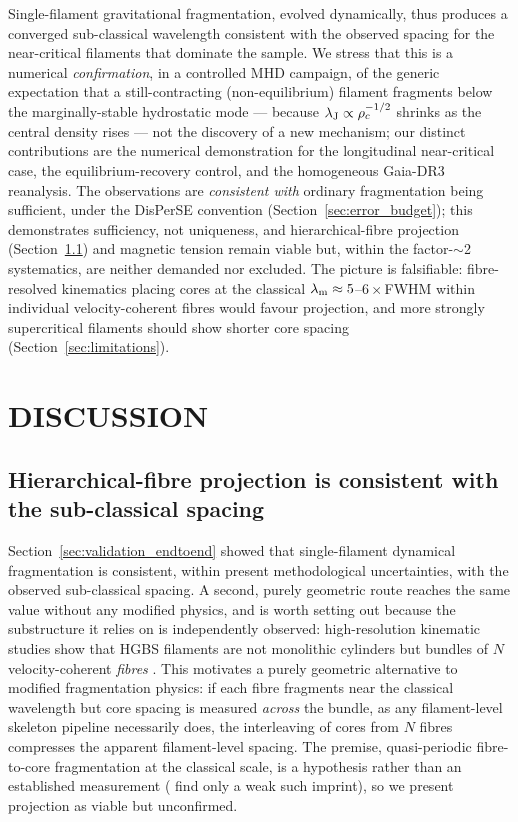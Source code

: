 \documentclass[usenatbib,twoside,twocolumn]{mnras}
\begin{document}
Single-filament gravitational fragmentation, evolved dynamically, thus produces a converged sub-classical wavelength consistent with the observed spacing for the near-critical filaments that dominate the sample. We stress that this is a numerical \emph{confirmation}, in a controlled MHD campaign, of the generic expectation that a still-contracting (non-equilibrium) filament fragments below the marginally-stable hydrostatic mode \citep{Clarke2016,Clarke2017,Clarke2020} --- because $\lambda_{\rm J}\propto\rho_c^{-1/2}$ shrinks as the central density rises --- not the discovery of a new mechanism; our distinct contributions are the numerical demonstration for the longitudinal near-critical case, the equilibrium-recovery control, and the homogeneous Gaia-DR3 reanalysis. The observations are \emph{consistent with} ordinary fragmentation being sufficient, under the DisPerSE convention (Section~\ref{sec:error_budget}); this demonstrates sufficiency, not uniqueness, and hierarchical-fibre projection (Section~\ref{sec:fibre_projection}) and magnetic tension remain viable but, within the factor-$\sim$2 systematics, are neither demanded nor excluded. The picture is falsifiable: fibre-resolved kinematics placing cores at the classical $\lambda_{\rm m}\approx5$--$6\times$FWHM within individual velocity-coherent fibres would favour projection, and more strongly supercritical filaments should show shorter core spacing (Section~\ref{sec:limitations}).

\section{DISCUSSION}
\label{sec:discussion}

\subsection{Hierarchical-fibre projection is consistent with the sub-classical spacing}
\label{sec:fibre_projection}

Section~\ref{sec:validation_endtoend} showed that single-filament dynamical fragmentation is consistent, within present methodological uncertainties, with the observed sub-classical spacing. A second, purely geometric route reaches the same value without any modified physics, and is worth setting out because the substructure it relies on is independently observed: high-resolution kinematic studies show that HGBS filaments are not monolithic cylinders but bundles of $N$ velocity-coherent \emph{fibres} \citep{Hacar2013,Hacar2018,Yang2024}. This motivates a purely geometric alternative to modified fragmentation physics: if each fibre fragments near the classical wavelength but core spacing is measured \emph{across} the bundle, as any filament-level skeleton pipeline necessarily does, the interleaving of cores from $N$ fibres compresses the apparent filament-level spacing. The premise, quasi-periodic fibre-to-core fragmentation at the classical scale, is a hypothesis rather than an established measurement (\citealt{Yang2024} find only a weak such imprint), so we present projection as viable but unconfirmed.
\end{document}

